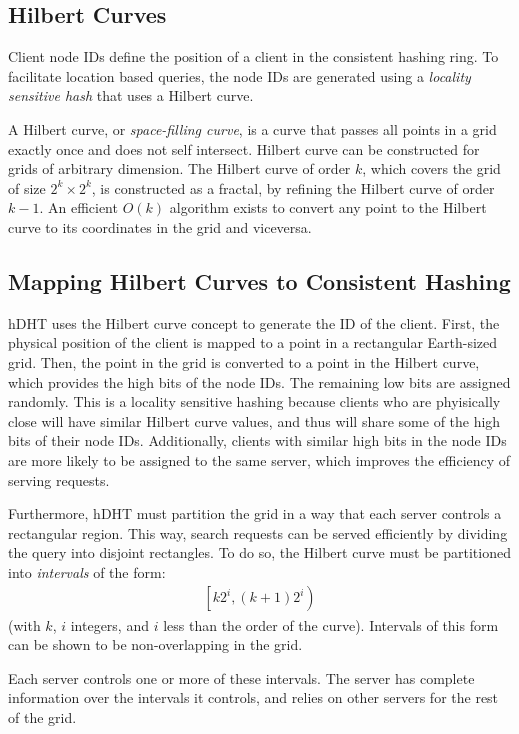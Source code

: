 \subsection{Hilbert Curves}

Client node IDs define the position of a client in the consistent hashing ring.
To facilitate location based queries, the node IDs are generated using a \textit{locality sensitive hash} that uses a Hilbert curve.

A Hilbert curve, or \textit{space-filling curve}, is a curve that passes all points in a grid exactly once and does not self intersect.
Hilbert curve can be constructed for grids of arbitrary dimension.
The Hilbert curve of order $k$, which covers the grid of size $2^k \times 2^k$, is constructed as a fractal, by refining the Hilbert curve of order $k-1$.
An efficient $O(k)$ algorithm exists to convert any point to the Hilbert curve to its coordinates in the grid and viceversa.

\subsection{Mapping Hilbert Curves to Consistent Hashing}

hDHT uses the Hilbert curve concept to generate the ID of the client.
First, the physical position of the client is mapped to a point in a rectangular Earth-sized grid.
Then, the point in the grid is converted to a point in the Hilbert curve, which provides the high bits of the node IDs.
The remaining low bits are assigned randomly.
This is a locality sensitive hashing because clients who are phyisically close will have similar Hilbert curve values, and thus will share some of the high bits of their node IDs.
Additionally, clients with similar high bits in the node IDs are more likely to be assigned to the same server, which improves the efficiency of serving requests.

Furthermore, hDHT must partition the grid in a way that each server controls a rectangular region.
This way, search requests can be served efficiently by dividing the query into disjoint rectangles.
To do so, the Hilbert curve must be partitioned into \textit{intervals} of the form:
\begin{align}
\left[k 2^i, (k+1) 2^i\right)
\end{align}
(with $k$, $i$ integers, and $i$ less than the order of the curve).
Intervals of this form can be shown to be non-overlapping in the grid.

Each server controls one or more of these intervals.
The server has complete information over the intervals it controls, and relies on other servers for the rest of the grid.


